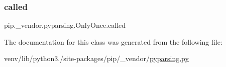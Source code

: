 \mbox{\label{classpip_1_1__vendor_1_1pyparsing_1_1OnlyOnce_a1431639d0a042ffb61479adcb092d518}} 
\subsubsection{\texorpdfstring{called}{called}}
{\footnotesize\ttfamily pip.\+\_\+vendor.\+pyparsing.\+Only\+Once.\+called}



The documentation for this class was generated from the following file\+:\begin{DoxyCompactItemize}
\item 
venv/lib/python3./site-\/packages/pip/\+\_\+vendor/\hyperlink{pip_2__vendor_2pyparsing_8py}{pyparsing.\+py}\end{DoxyCompactItemize}
